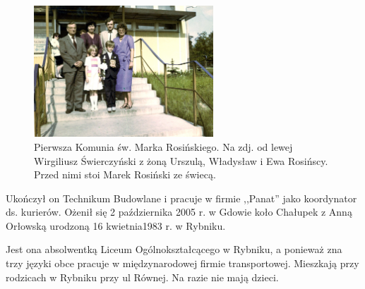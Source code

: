 \begin{figure}[!h]
\begin{center}
\includegraphics[width=0.6\textwidth]{photo/marek_rosinski_komunia.jpg}
\caption[Pierwsza Komunia św. Marka Rosińskiego]{Pierwsza Komunia św. Marka Rosińskiego. Na zdj. od lewej Wirgiliusz Świerczyński z żoną Urszulą, Władysław i Ewa Rosińscy. Przed nimi stoi Marek Rosiński ze świecą.}
\label{rys:marek_rosinski_komunia}
\end{center}
\end{figure}

Ukończył on Technikum Budowlane i pracuje w firmie ,,Panat'' jako koordynator ds. kurierów. Ożenił się 2 października 2005 r. w Gdowie koło Chałupek z Anną Orłowską urodzoną 16 kwietnia1983 r. w Rybniku.

Jest ona absolwentką Liceum Ogólnokształcącego w Rybniku, a ponieważ zna trzy języki obce pracuje w międzynarodowej firmie transportowej. Mieszkają przy rodzicach w Rybniku przy ul Równej. Na razie nie mają dzieci.